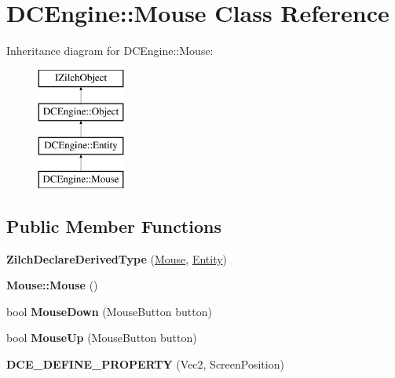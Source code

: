 \hypertarget{classDCEngine_1_1Mouse}{\section{D\-C\-Engine\-:\-:Mouse Class Reference}
\label{classDCEngine_1_1Mouse}
}
Inheritance diagram for D\-C\-Engine\-:\-:Mouse\-:\begin{figure}[H]
\begin{center}
\leavevmode
\includegraphics[height=4.000000cm]{classDCEngine_1_1Mouse}
\end{center}
\end{figure}
\subsection*{Public Member Functions}
\begin{DoxyCompactItemize}
\item 
\hypertarget{classDCEngine_1_1Mouse_ad1cf56a1ea3e7b0440291193693f9f89}{{\bfseries Zilch\-Declare\-Derived\-Type} (\hyperlink{classDCEngine_1_1Mouse}{Mouse}, \hyperlink{classDCEngine_1_1Entity}{Entity})}\label{classDCEngine_1_1Mouse_ad1cf56a1ea3e7b0440291193693f9f89}

\item 
\hypertarget{classDCEngine_1_1Mouse_a9bc0b41dedcb541d3ec7eaa8788e9eac}{{\bfseries Mouse\-::\-Mouse} ()}\label{classDCEngine_1_1Mouse_a9bc0b41dedcb541d3ec7eaa8788e9eac}

\item 
\hypertarget{classDCEngine_1_1Mouse_a604b278cdbb8f99304050c5b85db5f70}{bool {\bfseries Mouse\-Down} (Mouse\-Button button)}\label{classDCEngine_1_1Mouse_a604b278cdbb8f99304050c5b85db5f70}

\item 
\hypertarget{classDCEngine_1_1Mouse_a3ee43ac78e1893ae5b1820aabe8f4bd6}{bool {\bfseries Mouse\-Up} (Mouse\-Button button)}\label{classDCEngine_1_1Mouse_a3ee43ac78e1893ae5b1820aabe8f4bd6}

\item 
\hypertarget{classDCEngine_1_1Mouse_ab6c7685d8475db4eda3800da4311bb12}{{\bfseries D\-C\-E\-\_\-\-D\-E\-F\-I\-N\-E\-\_\-\-P\-R\-O\-P\-E\-R\-T\-Y} (Vec2, Screen\-Position)}\label{classDCEngine_1_1Mouse_ab6c7685d8475db4eda3800da4311bb12}

\end{DoxyCompactItemize}
